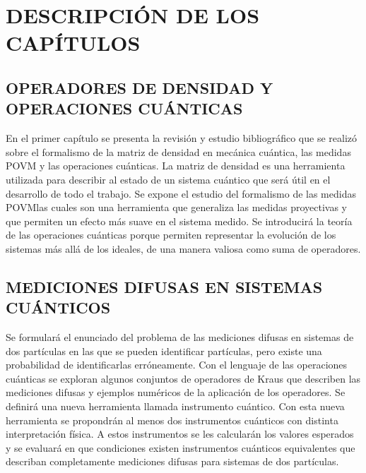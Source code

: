 \documentclass[12pt,oneside]{book}\raggedbottom{} %
\begin{document}
\begin{sloppypar}
{{%
\chapter{DESCRIPCIÓN DE LOS CAPÍTULOS}  %
\section{OPERADORES DE DENSIDAD Y OPERACIONES CUÁNTICAS}
En el primer capítulo  se presenta la revisión y estudio bibliográfico que se
realizó sobre el formalismo de la matriz de densidad en mecánica cuántica, las
medidas POVM y las operaciones cuánticas. La matriz de densidad es una
herramienta utilizada para describir al estado de un sistema cuántico que será
útil en el desarrollo de todo el trabajo.  Se expone el estudio del formalismo
de las medidas POVM\@ las cuales son una herramienta que generaliza las medidas
proyectivas y que permiten un efecto más suave en el sistema medido.  Se
introducirá la teoría de las operaciones cuánticas  porque permiten representar
la evolución de los sistemas más allá de los ideales, de una manera valiosa
como suma de operadores.

\section{MEDICIONES DIFUSAS EN SISTEMAS CUÁNTICOS}
Se formulará el enunciado del problema de las mediciones difusas en sistemas de
dos partículas en las que se pueden identificar partículas, pero existe una
probabilidad de identificarlas erróneamente. Con el lenguaje de las operaciones
cuánticas se exploran algunos conjuntos de operadores de Kraus que describen
las mediciones difusas y ejemplos numéricos de la aplicación de los operadores.
Se definirá una nueva herramienta llamada instrumento cuántico. Con esta nueva herramienta se propondrán al menos dos instrumentos cuánticos con distinta interpretación física. A estos instrumentos se les calcularán los valores esperados y se evaluará en que condiciones existen instrumentos cuánticos equivalentes que describan completamente mediciones difusas para sistemas de dos partículas.



}}
\end{sloppypar}
\end{document}
